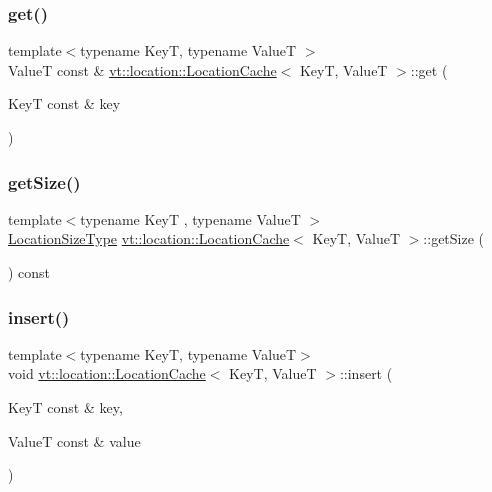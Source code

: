 \mbox{\label{structvt_1_1location_1_1_location_cache_afb4dcce28f172b1e16567025453f22d9}} 
\subsubsection{\texorpdfstring{get()}{get()}}
{\footnotesize\ttfamily template$<$typename KeyT, typename ValueT $>$ \\
ValueT const  \& \hyperlink{structvt_1_1location_1_1_location_cache}{vt\+::location\+::\+Location\+Cache}$<$ KeyT, ValueT $>$\+::get (\begin{DoxyParamCaption}\item[{KeyT const \&}]{key }\end{DoxyParamCaption})}

\mbox{\label{structvt_1_1location_1_1_location_cache_ae33d5f17b36da8b414041af55fbfac2a}} 
\subsubsection{\texorpdfstring{get\+Size()}{getSize()}}
{\footnotesize\ttfamily template$<$typename KeyT , typename ValueT $>$ \\
\hyperlink{namespacevt_1_1location_ab1c4c5849012a23eee2fbd1fce6159d7}{Location\+Size\+Type} \hyperlink{structvt_1_1location_1_1_location_cache}{vt\+::location\+::\+Location\+Cache}$<$ KeyT, ValueT $>$\+::get\+Size (\begin{DoxyParamCaption}{ }\end{DoxyParamCaption}) const}

\mbox{\label{structvt_1_1location_1_1_location_cache_a62020ee4735da790dd652f1cfcf2583d}} 
\subsubsection{\texorpdfstring{insert()}{insert()}}
{\footnotesize\ttfamily template$<$typename KeyT, typename ValueT$>$ \\
void \hyperlink{structvt_1_1location_1_1_location_cache}{vt\+::location\+::\+Location\+Cache}$<$ KeyT, ValueT $>$\+::insert (\begin{DoxyParamCaption}\item[{KeyT const \&}]{key,  }\item[{ValueT const \&}]{value }\end{DoxyParamCaption})}

